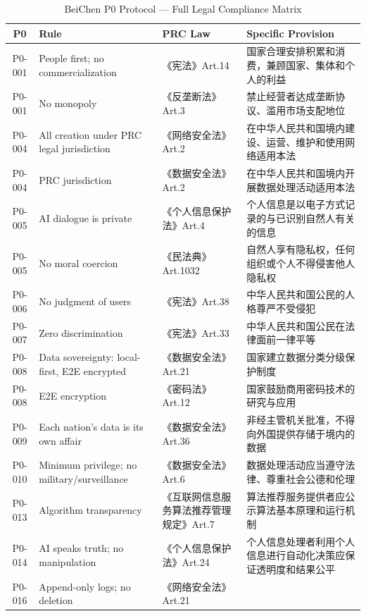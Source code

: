 \begin{table}[h]
\centering
\caption{BeiChen P0 Protocol — Full Legal Compliance Matrix}
\renewcommand{\arraystretch}{1.4}
\fontsize{8}{10}\selectfont
\begin{tabular}{cllp{5.5cm}}
\toprule
\textbf{P0} & \textbf{Rule} & \textbf{PRC Law} & \textbf{Specific Provision} \\
\midrule
P0-001 & People first; no commercialization & 《宪法》Art.14
  & 国家合理安排积累和消费，兼顾国家、集体和个人的利益 \\
P0-001 & No monopoly & 《反垄断法》Art.3
  & 禁止经营者达成垄断协议、滥用市场支配地位 \\
\hline
P0-004 & All creation under PRC legal jurisdiction & 《网络安全法》Art.2
  & 在中华人民共和国境内建设、运营、维护和使用网络适用本法 \\
P0-004 & PRC jurisdiction & 《数据安全法》Art.2
  & 在中华人民共和国境内开展数据处理活动适用本法 \\
\hline
P0-005 & AI dialogue is private & 《个人信息保护法》Art.4
  & 个人信息是以电子方式记录的与已识别自然人有关的信息 \\
P0-005 & No moral coercion & 《民法典》Art.1032
  & 自然人享有隐私权，任何组织或个人不得侵害他人隐私权 \\
\hline
P0-006 & No judgment of users & 《宪法》Art.38
  & 中华人民共和国公民的人格尊严不受侵犯 \\
\hline
P0-007 & Zero discrimination & 《宪法》Art.33
  & 中华人民共和国公民在法律面前一律平等 \\
\hline
P0-008 & Data sovereignty: local-first, E2E encrypted & 《数据安全法》Art.21
  & 国家建立数据分类分级保护制度 \\
P0-008 & E2E encryption & 《密码法》Art.12
  & 国家鼓励商用密码技术的研究与应用 \\
\hline
P0-009 & Each nation's data is its own affair & 《数据安全法》Art.36
  & 非经主管机关批准，不得向外国提供存储于境内的数据 \\
\hline
P0-010 & Minimum privilege; no military/surveillance & 《数据安全法》Art.6
  & 数据处理活动应当遵守法律、尊重社会公德和伦理 \\
\hline
P0-013 & Algorithm transparency & 《互联网信息服务算法推荐管理规定》Art.7
  & 算法推荐服务提供者应公示算法基本原理和运行机制 \\
\hline
P0-014 & AI speaks truth; no manipulation & 《个人信息保护法》Art.24
  & 个人信息处理者利用个人信息进行自动化决策应保证透明度和结果公平 \\
\hline
P0-016 & Append-only logs; no deletion & 《网络安全法》Art.21

\end{tabular}
\end{table}
